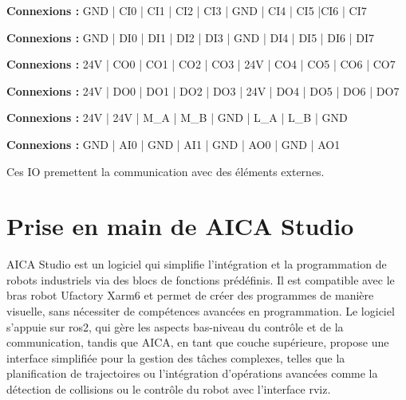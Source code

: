 \begin{tcolorbox}[colframe=black, colback=ConfigInputColor, title=Configurable Inputs]
    \textbf{Connexions :} GND | CI0 | CI1 | CI2 | CI3 | GND | CI4 | CI5 |CI6 | CI7
\end{tcolorbox}

\begin{tcolorbox}[colframe=black, colback=DigitalInputColor, title=Digital Inputs]
    \textbf{Connexions :} GND |  DI0 | DI1 | DI2 | DI3 | GND | DI4 | DI5 | DI6 | DI7
\end{tcolorbox}

\begin{tcolorbox}[colframe=black, colback=ConfigOutputColor, title=Configurable Outputs]
    \textbf{Connexions :} 24V | CO0 | CO1 | CO2 | CO3 | 24V | CO4 | CO5 | CO6 | CO7
\end{tcolorbox}

\begin{tcolorbox}[colframe=black, colback=DigitalOutputColor, title=Digital Outputs]
    \textbf{Connexions :} 24V | DO0 | DO1 | DO2 | DO3 | 24V | DO4 | DO5 | DO6 | DO7
\end{tcolorbox}

\begin{tcolorbox}[colframe=black, colback=RS485Color, title=RS485]
    \textbf{Connexions :} 24V | 24V | M\_A | M\_B | GND | L\_A | L\_B | GND
\end{tcolorbox}

\begin{tcolorbox}[colframe=black, colback=AnalogColor, title=Analog]
    \textbf{Connexions :} GND | AI0 | GND | AI1 | GND | AO0 | GND | AO1
\end{tcolorbox}

Ces IO premettent la communication avec des éléments externes.

\section{Prise en main de AICA Studio}
AICA Studio est un logiciel qui simplifie l'intégration et la programmation de robots industriels via des blocs de fonctions prédéfinis. Il est compatible avec le bras robot Ufactory Xarm6 et permet de créer des programmes de manière visuelle, sans nécessiter de compétences avancées en programmation. Le logiciel s'appuie sur \gls{ros2}, qui gère les aspects bas-niveau du contrôle et de la communication, tandis que AICA, en tant que couche supérieure, propose une interface simplifiée pour la gestion des tâches complexes, telles que la planification de trajectoires ou l'intégration d'opérations avancées comme la détection de collisions ou le contrôle du robot avec l'interface \gls{rviz}.

